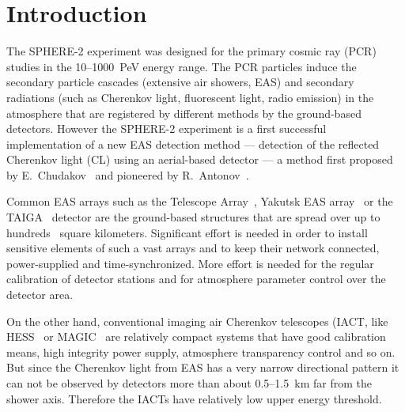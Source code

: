 \documentclass[final,5p,times,twocolumn]{elsarticle}
\begin{document}
\section{Introduction}
The SPHERE-2 experiment was designed for the primary cosmic ray (PCR) studies in the 10--1000~PeV energy range. The PCR particles induce the secondary particle cascades (extensive air showers, EAS) and secondary radiations (such as Cherenkov light, fluorescent light, radio emission) in the atmosphere that are registered by different methods by the ground-based detectors. However the SPHERE-2 experiment is a first successful implementation of a new EAS detection method --- detection of the reflected Cherenkov light (CL) using an aerial-based detector --- a method first proposed by E.~Chudakov~\cite{chu74} and pioneered by R.~Antonov~\cite{ant75, ant86, ant97, Ant15a}.%


Common EAS arrays such as the Telescope Array~\cite{abu12}, Yakutsk EAS array~\cite{Yakutsk19} or the TAIGA~\cite{TAIGA20} detector are the ground-based structures that are spread over up to hundreds~\cite{abu12} square kilometers. Significant effort is needed in order to install sensitive elements of such a vast arrays and to keep their network connected, power-supplied and time-synchronized. More effort is needed for the regular calibration of detector stations and for atmosphere parameter control over the detector area. 

On the other hand, conventional imaging air Cherenkov telescopes (IACT, like HESS~\cite{HESS03a, HESS03b} or MAGIC~\cite{MAGIC16-1, MAGIC16-2} are relatively compact systems that have good calibration means, high integrity power supply, atmosphere transparency control and so on. But since the Cherenkov light from EAS has a very narrow directional pattern it can not be observed by detectors more than about 0.5--1.5~km far from the shower axis. Therefore the IACTs have relatively low upper energy threshold.
\end{document}
